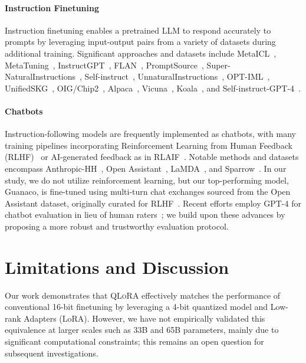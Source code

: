 \paragraph{Instruction Finetuning} Instruction finetuning enables a pretrained LLM to respond accurately to prompts by leveraging input-output pairs from a variety of datasets during additional training. Significant approaches and datasets include MetaICL~\citep{min2021metaicl}, MetaTuning~\citep{zhong2021adapting}, InstructGPT~\citep{ouyang2022training}, FLAN~\citep{wei2021finetuned,chung2022scaling}, PromptSource~\citep{bach2022promptsource}, Super-NaturalInstructions~\citep{wang2022super,sanh2021multitask}, Self-instruct~\citep{wang2022self}, UnnaturalInstructions~\citep{honovich2022unnatural}, OPT-IML~\citep{iyer2022opt}, UnifiedSKG~\citep{xie2022unifiedskg}, OIG/Chip2~\citep{laion2023}, Alpaca~\citep{alpaca}, Vicuna~\citep{vicuna2023}, Koala~\citep{koala_blogpost_2023}, and Self-instruct-GPT-4~\citep{peng2023instruction}.

\paragraph{Chatbots} Instruction-following models are frequently implemented as chatbots, with many training pipelines incorporating Reinforcement Learning from Human Feedback (RLHF)~\citep{christiano2017deep} or AI-generated feedback as in RLAIF~\citep{bai2022constitutional}. Notable methods and datasets encompass Anthropic-HH~\citep{askell2021general,bai2022training}, Open Assistant~\citep{kopf2023openassistant}, LaMDA~\citep{thoppilan2022lamda}, and Sparrow~\citep{glaese2022improving}. In our study, we do not utilize reinforcement learning, but our top-performing model, Guanaco, is fine-tuned using multi-turn chat exchanges sourced from the Open Assistant dataset, originally curated for RLHF~\citep{kopf2023openassistant}. Recent efforts employ GPT-4 for chatbot evaluation in lieu of human raters~\citep{vicuna2023,peng2023instruction}; we build upon these advances by proposing a more robust and trustworthy evaluation protocol.

\section{Limitations and Discussion}

Our work demonstrates that \textsc{QLoRA} effectively matches the performance of conventional 16-bit finetuning by leveraging a 4-bit quantized model and Low-rank Adapters (LoRA). However, we have not empirically validated this equivalence at larger scales such as 33B and 65B parameters, mainly due to significant computational constraints; this remains an open question for subsequent investigations.

